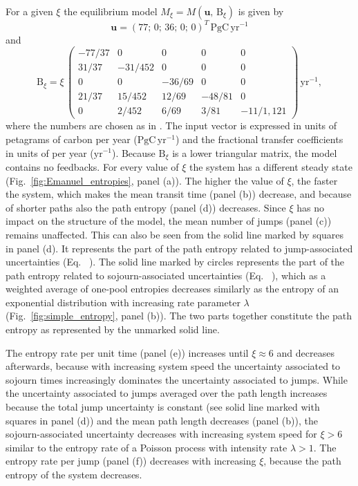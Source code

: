 \documentclass[smallextended]{svjour3}
\makeatletter
\renewcommand*{\eqref}[1]{%
  \hyperref[{#1}]{\textup{\tagform@{\ref*{#1}}}}%
}
\renewcommand{\tens}[1]{\mathrm{#1}}
\renewcommand{\vec}[1]{\mathbf{#1}}
\newcommand{\peta}{\mathrm{P}}
\newcommand{\gC}{\mathrm{gC}}
\newcommand{\yr}{\mathrm{yr}}
\newcommand{\transpose}{T}
\makeatother
\begin{document}
For a given $\xi$ the equilibrium model $M_\xi=M(\vec{u},\,\tens{B}_\xi)$ is given by
\begin{equation}
  \vec{u} = (77;\,0;\,36;\,0;\,0)^{\transpose}\, \peta\gC\,\yr^{-1}
\end{equation}
and
\begin{equation}
    \tens{B}_\xi = \xi\,\left(\begin{matrix}
      -77/37 &       0 &      0 &      0 & 	  0\\
       31/37 & -31/452 &      0 &      0 & 	  0\\
	   0 &       0 & -36/69 &      0 & 	  0\\
       21/37 &  15/452 &  12/69 & -48/81 & 	  0\\
	   0 &   2/452 &   6/69 &   3/81 & -11/1,121
	 \end{matrix}\right)\,\yr^{-1},
\end{equation}
where the numbers are chosen as in \citet{Thompson1999GCB}. 
The input vector is expressed in units of petagrams of carbon per year ($\peta\gC\,\yr^{-1}$) and the fractional transfer coefficients in units of per year ($\yr^{-1}$).
Because $\tens{B}_\xi$ is a lower triangular matrix, the model contains no feedbacks.
For every value of $\xi$ the system has a different steady state (Fig.~\ref{fig:Emanuel_entropies}, panel (a)).
The higher the value of $\xi$, the faster the system, which makes the mean transit time (panel (b)) decrease, and because of shorter paths also the path entropy (panel (d)) decreases.
Since $\xi$ has no impact on the structure of the model, the mean number of jumps (panel (c)) remains unaffected.
This can also be seen from the solid line marked by squares in panel (d).
It represents the part of the path entropy related to jump-associated uncertainties (Eq.~\eqref{eqn:H_discrete}).
The solid line marked by circles represents the part of the path entropy related to sojourn-associated uncertainties (Eq.~\eqref{eqn:H_continuous}), which as a weighted average of one-pool entropies decreases similarly as the entropy of an exponential distribution with increasing rate parameter $\lambda$ (Fig.~\ref{fig:simple_entropy}, panel (b)).
The two parts together constitute the path entropy as represented by the unmarked solid line.

The entropy rate per unit time (panel (e)) increases until $\xi\approx6$ and decreases afterwards, because with increasing system speed the uncertainty associated to sojourn times increasingly dominates the uncertainty associated to jumps.
While the uncertainty associated to jumps averaged over the path length increases because the total jump uncertainty is constant (see solid line marked with squares in panel (d)) and the mean path length decreases (panel (b)), the sojourn-associated uncertainty decreases with increasing system speed for $\xi>6$ similar to the entropy rate of a Poisson process with intensity rate $\lambda>1$.
The entropy rate per jump (panel (f)) decreases with increasing $\xi$, because the path entropy of the system decreases.
\end{document}
